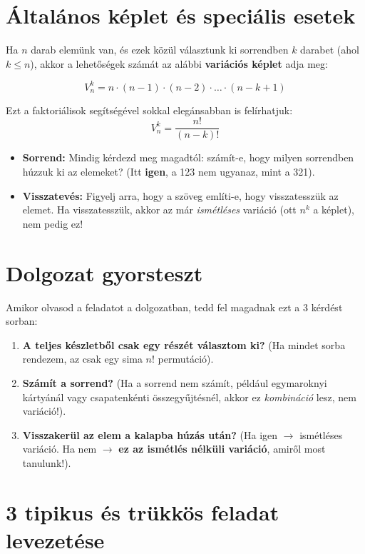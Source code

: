\documentclass[11pt,a4paper]{article}
\begin{document}
\section{Általános képlet és speciális esetek}
Ha $n$ darab elemünk van, és ezek közül választunk ki sorrendben $k$ darabet (ahol $k \le n$), akkor a lehetőségek számát az alábbi \textbf{variációs képlet} adja meg:

\[ V_n^k = n \cdot (n-1) \cdot (n-2) \cdot \dots \cdot (n - k + 1) \]

Ezt a faktoriálisok segítségével sokkal elegánsabban is felírhatjuk:
\[ V_n^k = \frac{n!}{(n-k)!} \]

\begin{tcolorbox}[colback=myboxbg,colframe=myaccent,title=\textbf{Vigyázz a csapdákra!}]
\begin{itemize}
    \item \textbf{Sorrend:} Mindig kérdezd meg magadtól: számít-e, hogy milyen sorrendben húzzuk ki az elemeket? (Itt \textbf{igen}, a 123 nem ugyanaz, mint a 321).
    \item \textbf{Visszatevés:} Figyelj arra, hogy a szöveg említi-e, hogy visszatesszük az elemet. Ha visszatesszük, akkor az már \emph{ismétléses} variáció (ott $n^k$ a képlet), nem pedig ez!
\end{itemize}
\end{tcolorbox}

\section{Dolgozat gyorsteszt}
Amikor olvasod a feladatot a dolgozatban, tedd fel magadnak ezt a 3 kérdést sorban:
\begin{enumerate}
    \item \textbf{A teljes készletből csak egy részét választom ki?} (Ha mindet sorba rendezem, az csak egy sima $n!$ permutáció).
    \item \textbf{Számít a sorrend?} (Ha a sorrend nem számít, például egymaroknyi kártyánál vagy csapatenkénti összegyűjtésnél, akkor ez \emph{kombináció} lesz, nem variáció!).
    \item \textbf{Visszakerül az elem a kalapba húzás után?} (Ha igen $\rightarrow$ ismétléses variáció. Ha nem $\rightarrow$ \textbf{ez az ismétlés nélküli variáció}, amiről most tanulunk!).
\end{enumerate}

\section{3 tipikus és trükkös feladat levezetése}
\end{document}
